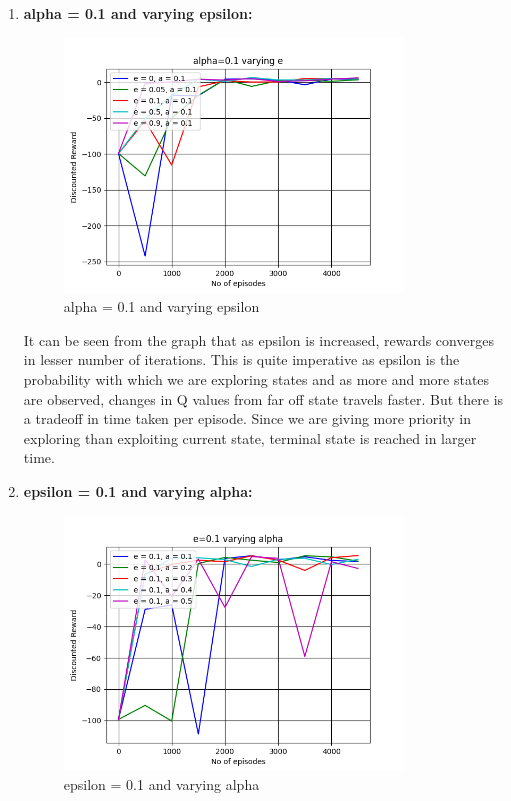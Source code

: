 \documentclass{article}
\begin{document}
\begin{enumerate}[a)]
\begin{enumerate}
    \item \textbf{alpha = 0.1 and varying epsilon: }
    
    \begin{center}
        \begin{figure}[H]
        \hfill\includegraphics[width=9cm]{QB4_alpha=0.1.png}\hspace*{\fill}
        \caption{alpha = 0.1 and varying epsilon}
        \label{fig: alpha = 0.1 and varying epsilon}
    \end{figure}
    \end{center}

    It can be seen from the graph that as epsilon is increased, rewards converges in lesser number of iterations. This is quite imperative as 
    epsilon is the probability with which we are exploring states and as more and more states are observed, changes in Q values from far off state travels 
    faster. But there is a tradeoff in time taken per episode. Since we are giving more priority in exploring than exploiting current state, terminal state is 
    reached in larger time.

    \item \textbf{epsilon = 0.1 and varying alpha: }
    
    \begin{center}
        \begin{figure}[H]
        \hfill\includegraphics[width=9cm]{QB4_e=0.1.png}\hspace*{\fill}
        \caption{epsilon = 0.1 and varying alpha}
        \label{fig: epsilon = 0.1 and varying alpha}
    \end{figure}
    \end{center}


\end{enumerate}
\end{enumerate}
\end{document}

